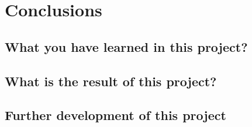 \documentclass[12pt,a4paper]{article}
\begin{document}
\section{Conclusions}

\subsection{What you have learned in this project?}

\subsection{What is the result of this project?}

\subsection{Further development of this project}
\end{document}
